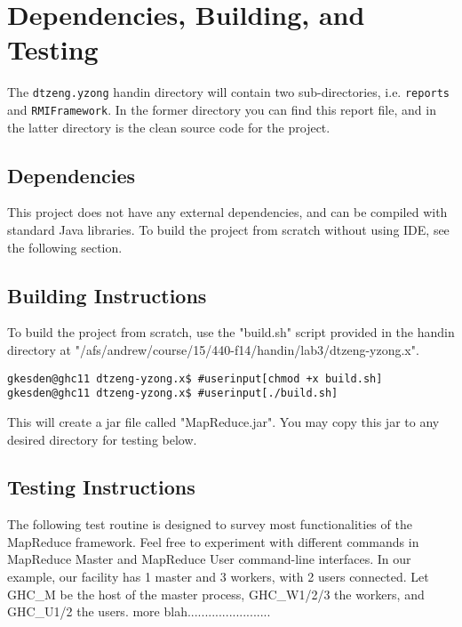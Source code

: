 \documentclass{article} %
\begin{document}
\section{Dependencies, Building, and Testing}

\par\qquad The \texttt{dtzeng.yzong} handin directory will contain two sub-directories, i.e. \texttt{reports} and \texttt{RMIFramework}. In the former directory you can find this report file, and in the latter directory is the clean source code for the project.

\subsection{Dependencies}

\par\qquad This project does not have any external dependencies, and can be compiled with standard Java libraries. To build the project from scratch without using IDE, see the following section.

\subsection{Building Instructions}

\par\qquad To build the project from scratch, use the "build.sh" script provided in the handin directory at "/afs/andrew/course/15/440-f14/handin/lab3/dtzeng-yzong.x".

\begin{Verbatim}[commandchars=\#\[\]]
gkesden@ghc11 dtzeng-yzong.x$ #userinput[chmod +x build.sh]
gkesden@ghc11 dtzeng-yzong.x$ #userinput[./build.sh]

\end{Verbatim}

\par\qquad This will create a jar file called "MapReduce.jar".  You may copy this jar to any desired directory for testing below.

\subsection{Testing Instructions}

\par\qquad The following test routine is designed to survey most functionalities of the MapReduce framework. Feel free to experiment with different commands in MapReduce Master and MapReduce User command-line interfaces.  In our example, our facility has 1 master and 3 workers, with 2 users connected.  Let GHC_M be the host of the master process, GHC_W1/2/3 the workers, and GHC_U1/2 the users.  more blah........................
\end{document}
